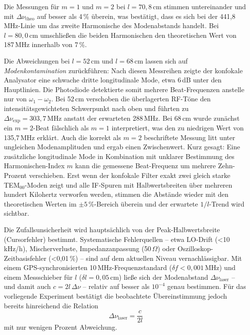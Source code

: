 Die Messungen für $m=1$ und $m=2$ bei $l=70{,}8\,\mathrm{cm}$ stimmen untereinander und mit $\Delta\nu_{\mathrm{theo}}$ auf besser als 4\,\% überein, was bestätigt, dass es sich bei der 441{,}8\,MHz-Linie um das zweite Harmonische des Modenabstands handelt. 
Bei $l=80{,}0\,\mathrm{cm}$ umschließen die beiden Harmonischen den theoretischen Wert von 187\,MHz innerhalb von 7\,\%.

Die Abweichungen bei $l = 52\,\si{\centi\meter}$ und $l = 68\,\si{\centi\meter}$ lassen sich auf \emph{Modenkontamination} zurückführen: 
Nach diesen Messreihen zeigte der konfokale Analysator eine schwache dritte longitudinale Mode, etwa 6\,dB unter den Hauptlinien. 
Die Photodiode detektierte somit mehrere Beat-Frequenzen anstelle nur von $\omega_{1} - \omega_{2}$. 
Bei 52\,cm verschoben die überlagerten RF-Töne den intensitätsgewichteten Schwerpunkt nach oben und führten zu $\Delta\nu_{\mathrm{exp}} = 303{,}7\,\mathrm{MHz}$ anstatt der erwarteten 288\,MHz. 
Bei 68\,cm wurde zunächst ein $m=2$-Beat fälschlich als $m=1$ interpretiert, was den zu niedrigen Wert von 135{,}7\,MHz erklärt. 
Auch die korrekt als $m=2$ beschriftete Messung litt unter ungleichen Modenamplituden und ergab einen Zwischenwert. 
Kurz gesagt: 
Eine zusätzliche longitudinale Mode in Kombination mit unklarer Bestimmung des Harmonischen-Index $m$ kann die gemessene Beat-Frequenz um mehrere Zehn-Prozent verschieben. 
Erst wenn der konfokale Filter exakt zwei gleich starke TEM$_{00}$-Moden zeigt und alle IF-Spuren mit Halbwertsbreiten über mehreren hundert Kilohertz verworfen werden, stimmen die Abstände wieder mit den theoretischen Werten im $\pm5\,\%$-Bereich überein und der erwartete $1/l$-Trend wird sichtbar.

Die Zufallsunsicherheit wird hauptsächlich von der Peak-Halbwertsbreite (Cursorfehler) bestimmt. 
Systematische Fehlerquellen – etwa LO-Drift (<10\,kHz/h), Mischerverluste, Impedanzanpassung (50\,$\Omega$) oder Oszilloskop-Zeitbasisfehler (<0{,}01\,\%) – sind auf dem aktuellen Niveau vernachlässigbar. 
Mit einem GPS-synchronisierten 10\,MHz-Frequenzstandard ($\delta f < 0{,}001\,\mathrm{MHz}$) und einem Messschieber für $l$ ($\delta l = 0{,}05\,\mathrm{cm}$) ließe sich der Modenabstand $\Delta\nu_{\mathrm{laser}}$ – und damit auch $c = 2l\,\Delta\nu$ – relativ auf besser als $10^{-4}$ genau bestimmen. 
Für das vorliegende Experiment bestätigt die beobachtete Übereinstimmung jedoch bereits hinreichend die Relation
\[
\Delta\nu_{\mathrm{laser}} = \frac{c}{2l}
\]
mit nur wenigen Prozent Abweichung.

